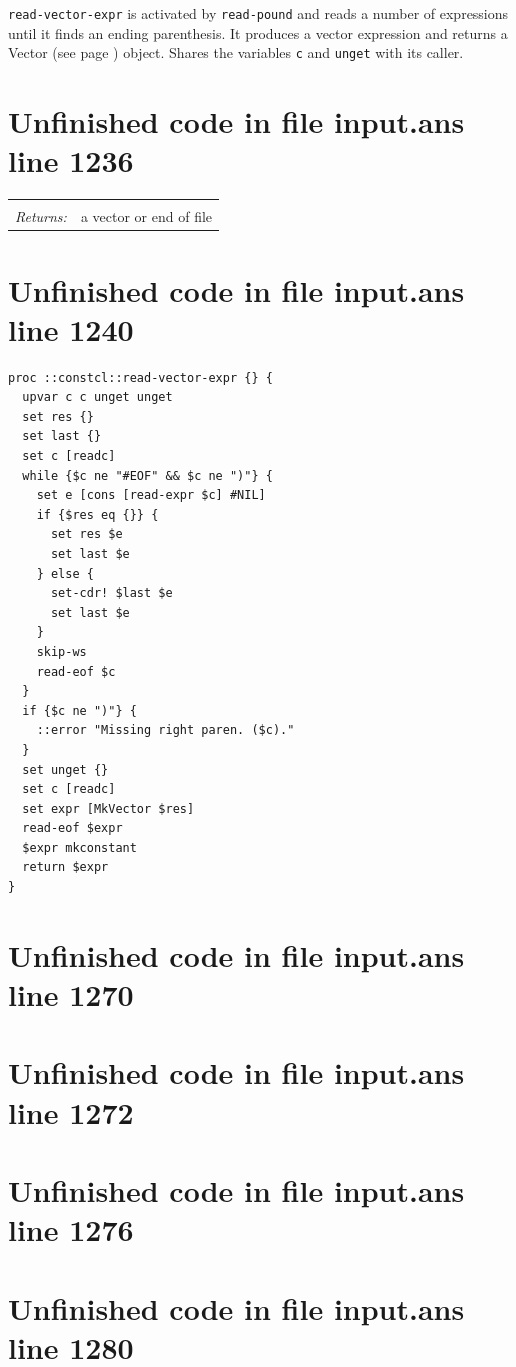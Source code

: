 \documentclass[twoside,9pt]{report}
\begin{document}
\texttt{read-vector-expr} is activated by \texttt{read-pound} and reads a number of expressions until it finds an ending parenthesis. It produces a vector expression and returns a Vector (see page \pageref{vectors}) object. Shares the variables \texttt{c} and \texttt{unget} with its caller.

\section{Unfinished code in file input.ans line 1236}
\noindent\begin{tabular}{ |p{1.9cm} p{8cm}| }
\hline
\rowcolor[HTML]{CCCCCC} \multicolumn{2}{|l|}{\bf read-vector-expr (internal)} \\
\textit{Returns:} & a vector or end of file \\
\hline
\end{tabular}
\section{Unfinished code in file input.ans line 1240}
\begin{lstlisting}
proc ::constcl::read-vector-expr {} {
  upvar c c unget unget
  set res {}
  set last {}
  set c [readc]
  while {$c ne "#EOF" && $c ne ")"} {
    set e [cons [read-expr $c] #NIL]
    if {$res eq {}} {
      set res $e
      set last $e
    } else {
      set-cdr! $last $e
      set last $e
    }
    skip-ws
    read-eof $c
  }
  if {$c ne ")"} {
    ::error "Missing right paren. ($c)."
  }
  set unget {}
  set c [readc]
  set expr [MkVector $res]
  read-eof $expr
  $expr mkconstant
  return $expr
}
\end{lstlisting}
\section{Unfinished code in file input.ans line 1270}
\section{Unfinished code in file input.ans line 1272}
\section{Unfinished code in file input.ans line 1276}
\section{Unfinished code in file input.ans line 1280}
\end{document}
